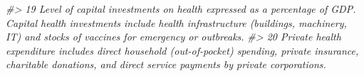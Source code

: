 \documentclass[
  xelatex, ja=standard]{bxjsbook}
\newenvironment{Shaded}{\begin{snugshade}}{\end{snugshade}}
\newcommand{\CommentTok}[1]{\textcolor[rgb]{0.56,0.35,0.01}{\textit{#1}}}
\theoremstyle{definition}
\theoremstyle{definition}
\theoremstyle{definition}
\theoremstyle{definition}
\theoremstyle{remark}
\begin{document}
\begin{Shaded}
\begin{Highlighting}[]
\CommentTok{\#\textgreater{} 19                                                                                                                                                                                                                                                                                                                                                                                                                                                                                                                                                                                                                                                                                                                                                                                                                                                                                                                                                                                                                                                                                                                                                                                                                                  Level of capital investments on health expressed as a percentage of GDP.  Capital health investments include health infrastructure (buildings, machinery, IT) and stocks of vaccines for emergency or outbreaks.}
\CommentTok{\#\textgreater{} 20                                                                                                                                                                                                                                                                                                                                                                                                                                                                                                                                                                                                                                                                                                                                                                                                                                                                                                                                                                                                                                                                                                                                                                                                                                                                      Private health expenditure includes direct household (out{-}of{-}pocket) spending, private insurance, charitable donations, and direct service payments by private corporations.}

\end{Highlighting}
\end{Shaded}
\end{document}
